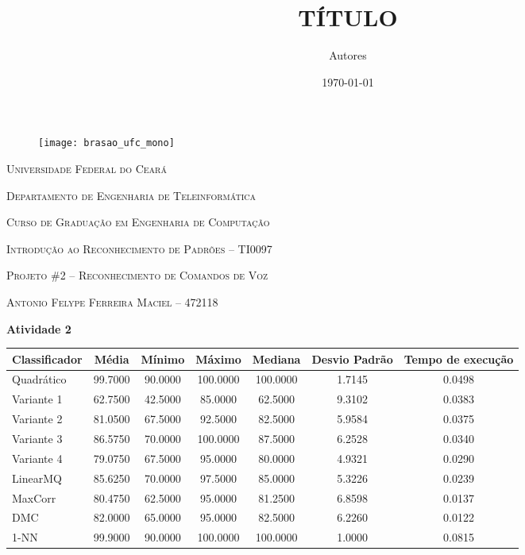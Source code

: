\documentclass[12pt]{article}
\title{\Large \textbf{TÍTULO}}
\author{Autores}
\date{\today}
\begin{document}
	\begin{wrapfigure}{l}{1.5cm}
		\texttt{[image: brasao\_ufc\_mono]}
	\end{wrapfigure}

	\textsc{Universidade Federal do Ceará}
			
	\textsc{Departamento de Engenharia de Teleinformática}
			
	\textsc{Curso de Graduação em Engenharia de Computação}
			
	\textsc{Introdução ao Reconhecimento de Padrões -- TI0097}
	
	\hfill
	
	\Large{\textsc{Projeto \#2 -- Reconhecimento de Comandos de Voz}}
	
	\normalsize
	
	\textsc{Antonio Felype Ferreira Maciel -- 472118}
	
	
	\hfill
		
	\textbf{Atividade 2}
	
	\hfill
	
	\begin{tabular}{lcccccc}
		\hline
		Classificador & Média & Mínimo & Máximo & Mediana & Desvio Padrão & Tempo de execução \\
		\hline
		Quadrático &  99.7000 &  90.0000 & 100.0000 & 100.0000 &   1.7145 &   0.0498 \\
		Variante 1 &  62.7500 &  42.5000 &  85.0000 &  62.5000 &   9.3102 &   0.0383 \\
		Variante 2 &  81.0500 &  67.5000 &  92.5000 &  82.5000 &   5.9584 &   0.0375 \\
		Variante 3 &  86.5750 &  70.0000 & 100.0000 &  87.5000 &   6.2528 &   0.0340 \\
		Variante 4 &  79.0750 &  67.5000 &  95.0000 &  80.0000 &   4.9321 &   0.0290 \\
		LinearMQ   &  85.6250 &  70.0000 &  97.5000 &  85.0000 &   5.3226 &   0.0239 \\
		MaxCorr    &  80.4750 &  62.5000 &  95.0000 &  81.2500 &   6.8598 &   0.0137 \\
		DMC        &  82.0000 &  65.0000 &  95.0000 &  82.5000 &   6.2260 &   0.0122 \\
		1-NN       &  99.9000 &  90.0000 & 100.0000 & 100.0000 &   1.0000 &   0.0815 \\
		\hline
	\end{tabular}
	
	\hfill
	
\end{document}
